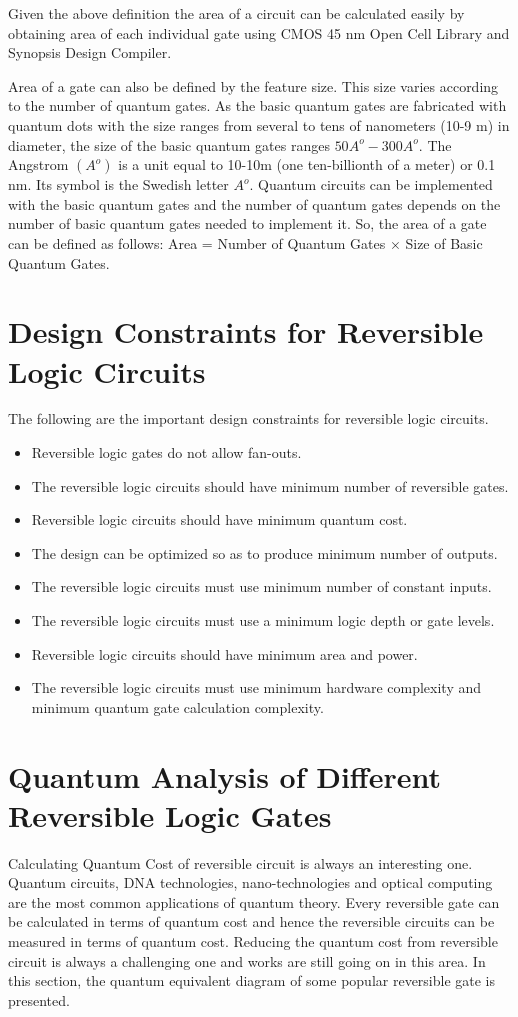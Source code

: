 Given the above definition the area of a circuit can be calculated easily by obtaining area of each individual gate using CMOS 45 nm Open Cell Library and Synopsis Design Compiler.

Area of a gate can also be defined by the feature size. This size varies according to the number of quantum gates. As the basic quantum gates are fabricated with quantum dots with the size ranges from several to tens of nanometers (10-9 m) in diameter, the size of the basic quantum gates ranges $50A^o-300A^o$. The Angstrom $(A^o)$ is a unit equal to 10-10m (one ten-billionth of a meter) or 0.1 nm. Its symbol is the Swedish letter $A^o$. Quantum circuits can be implemented with the basic quantum gates and the number of quantum gates depends on the number of basic quantum gates needed to implement it. So, the area of a gate can be defined as follows: Area = Number of Quantum Gates $\times$ Size of Basic Quantum Gates.

\section{Design Constraints for Reversible Logic Circuits}
The following are the important design constraints for reversible logic circuits.

\begin{itemize}
\item Reversible logic gates do not allow fan-outs.
\item The reversible logic circuits should have minimum number of reversible gates.
\item Reversible logic circuits should have minimum quantum cost.
\item The design can be optimized so as to produce minimum number of  outputs.
\item The reversible logic circuits must use minimum number of constant inputs.
\item The reversible logic circuits must use a minimum logic depth or gate levels.
\item Reversible logic circuits should have minimum area and power.
\item The reversible logic circuits must use minimum hardware complexity and minimum quantum gate calculation complexity.
\end{itemize}

\section{Quantum Analysis of Different Reversible Logic Gates}
Calculating Quantum Cost of reversible circuit is always an interesting one. Quantum circuits, DNA technologies, nano-technologies and optical computing are the most common applications of quantum theory. Every reversible gate can be calculated in terms of quantum cost and hence the reversible circuits can be measured in terms of quantum cost. Reducing the quantum cost from reversible circuit is always a challenging one and works are still going on in this area. In this section, the quantum equivalent diagram of some popular reversible gate is presented.

